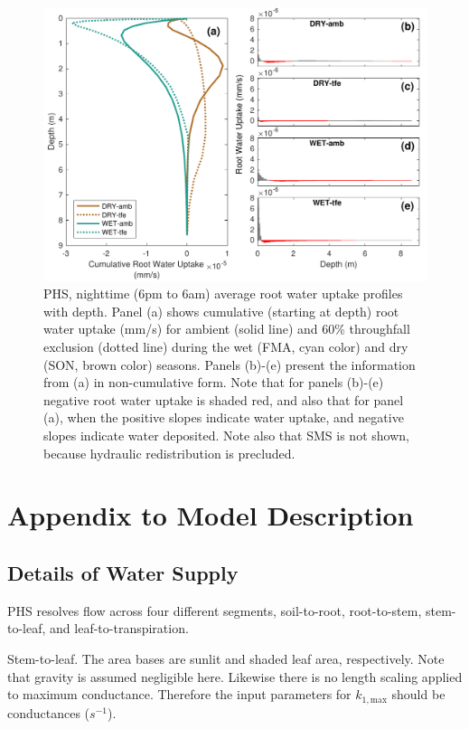 \documentclass[draft,linenumbers]{agujournal}
\begin{document}
    \begin{figure}[h]
     \centering
     \includegraphics[width=30pc]{../figs2/fig10.pdf}
     \caption{PHS, nighttime (6pm to 6am) average root water uptake profiles with depth. 
     Panel (a) shows cumulative (starting at depth) root water uptake (mm/s) for ambient (solid line) and 60\% throughfall exclusion (dotted line)
     during the wet (FMA, cyan color) and dry (SON, brown color) seasons. 
     Panels (b)-(e) present the information from (a) in non-cumulative form. 
     Note that for panels (b)-(e) negative root water uptake is shaded red, and also that for panel (a), 
     when the positive slopes indicate water uptake, and negative slopes indicate water deposited.
     Note also that SMS is not shown, because hydraulic redistribution is precluded.}
     \label{fig10}
  \end{figure}
  \clearpage
  



\section{Appendix to Model Description}

\subsection{Details of Water Supply}

PHS resolves flow across four different segments, soil-to-root, root-to-stem, stem-to-leaf, and leaf-to-transpiration.

Stem-to-leaf. The area bases are sunlit and shaded leaf area, respectively. 
Note that gravity is assumed negligible here. 
Likewise there is no length scaling applied to maximum conductance. 
Therefore the input parameters for $k_{1,\text{max}}$ should be conductances ($s^{-1}$).
\end{document}
